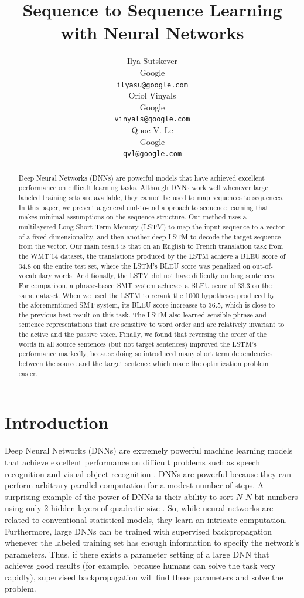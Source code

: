 \documentclass{article}
\title{Sequence to Sequence Learning\\with Neural Networks}
\author{
Ilya Sutskever \\
Google\\
\texttt{ilyasu@google.com} \\
\And
Oriol Vinyals \\
Google\\
\texttt{vinyals@google.com} \\
\And
Quoc V. Le \\
Google\\
\texttt{qvl@google.com} \\
}
\begin{document}
\maketitle

\begin{abstract}

Deep Neural Networks (DNNs) are powerful models that have achieved
excellent performance on difficult learning tasks. Although DNNs work
well whenever large labeled training sets are available, 
they cannot be used to map sequences to sequences.  In this paper, we
present a general end-to-end approach to sequence learning that makes
minimal assumptions on the sequence structure. Our method uses a
multilayered Long Short-Term Memory (LSTM) to map the input sequence
to a vector of a fixed dimensionality, and then another deep LSTM to
decode the target sequence from the vector.  Our main result is that
on an English to French translation task from the WMT'14 dataset, the
translations produced by the LSTM achieve a BLEU score of 34.8 on the
entire test set, where the LSTM's BLEU score was penalized on
out-of-vocabulary words. Additionally, the LSTM did not have
difficulty on long sentences. For comparison, a phrase-based
SMT system achieves a BLEU score of 33.3 on the same dataset.  When we
used the LSTM to rerank the 1000 hypotheses produced by the
aforementioned SMT system, its BLEU score increases to 36.5, which
is close to the previous best result on this task.  The LSTM also learned sensible
phrase and sentence representations that are sensitive to word order
and are relatively invariant to the active and the passive voice.
Finally, we found that reversing the order of the words in all source
sentences (but not target sentences) improved the LSTM's performance
markedly, because doing so introduced many short term dependencies
between the source and the target sentence which made the optimization
problem easier.

\end{abstract}

\section{Introduction}

Deep Neural Networks (DNNs) are extremely powerful machine learning
models that achieve excellent performance on difficult problems such
as speech recognition \cite{hinton12,dahl12b} and visual object
recognition \cite{kriz12,ciresan12,lecun98,le12}.  DNNs are
powerful because they can perform arbitrary parallel computation for a
modest number of steps.  A surprising example of the power of DNNs is
their ability to sort $N$ \!\!\!\!\quad $N$-bit numbers using only 2
hidden layers of quadratic size \cite{razborov}. So, while neural
networks are related to conventional statistical models, they learn an
intricate computation.  Furthermore, large DNNs can be trained with
supervised backpropagation whenever the labeled training set has
enough information to specify the network's parameters.  Thus, if
there exists a parameter setting of a large DNN that achieves good
results (for example, because humans can solve the task very rapidly),
supervised backpropagation will find these parameters and solve the
problem.
\end{document}
